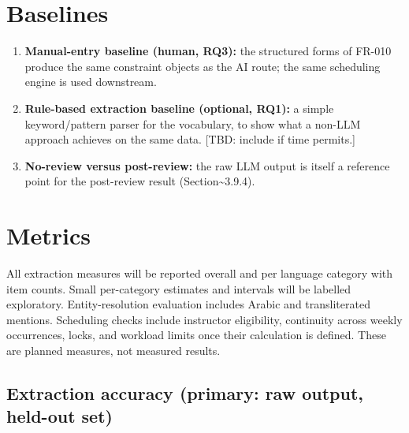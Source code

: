 \documentclass[
  11pt,a4paper,oneside]{report}
\providecommand{\tightlist}{%
  \setlength{\itemsep}{0pt}\setlength{\parskip}{0pt}}
\begin{document}
\hypertarget{baselines}{%
\section{Baselines}\label{baselines}}

\begin{enumerate}
\def\labelenumi{\arabic{enumi}.}
\tightlist
\item
  \textbf{Manual-entry baseline (human, RQ3):} the structured forms of
  FR-010 produce the same constraint objects as the AI route; the same
  scheduling engine is used downstream.
\item
  \textbf{Rule-based extraction baseline (optional, RQ1):} a simple
  keyword/pattern parser for the vocabulary, to show what a non-LLM
  approach achieves on the same data. {[}TBD: include if time
  permits.{]}
\item
  \textbf{No-review versus post-review:} the raw LLM output is itself a
  reference point for the post-review result
  (Section\textasciitilde3.9.4).
\end{enumerate}

\hypertarget{metrics}{%
\section{Metrics}\label{metrics}}

All extraction measures will be reported overall and per language category with item counts. Small per-category estimates and intervals will be labelled exploratory. Entity-resolution evaluation includes Arabic and transliterated mentions. Scheduling checks include instructor eligibility, continuity across weekly occurrences, locks, and workload limits once their calculation is defined. These are planned measures, not measured results.

\hypertarget{extraction-accuracy-primary-raw-output-held-out-set}{%
\subsection{Extraction accuracy (primary: raw output, held-out
set)}\label{extraction-accuracy-primary-raw-output-held-out-set}}
\end{document}
